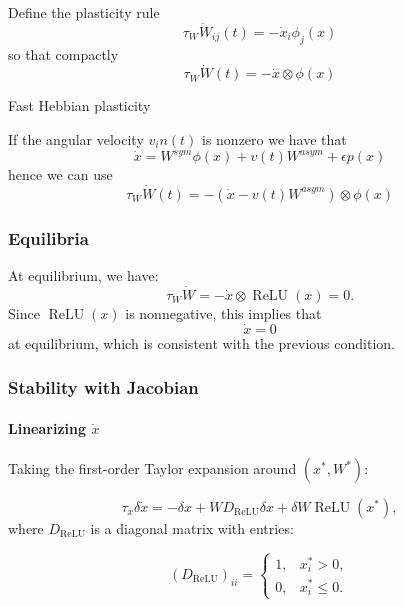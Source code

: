 \documentclass{article}
\theoremstyle{definition} \newtheorem{definition}{Definition}
\theoremstyle{remark} \newtheorem{remark}{Remark}
\newcounter{ct}
\begin{document}
Define the plasticity rule
\begin{equation}\label{eq:plasticity_heur}
\tau_W\dot W_{ij}(t) = - \dot x_i \phi_j(x) 
\end{equation}
so that compactly
\begin{equation}\label{eq:plasticity_heur_comp}
\tau_W\dot W(t) = - \dot x \otimes \phi(x) 
\end{equation}

Fast Hebbian plasticity \citep{lansner2023fast}

If the angular velocity $v_in(t)$ is nonzero we have that 
\begin{equation}
\dot x = W^{sym}\phi(x) + v(t)W^{asym} + \epsilon p(x)
\end{equation}
hence we can use
\begin{equation}\label{eq:plasticity_heur_comp_vin}
\tau_W\dot W(t) = - (\dot x - v(t)W^{asym}) \otimes \phi(x) 
\end{equation}

\subsubsection{Equilibria}
At equilibrium, we have:
\begin{equation}
    \tau_W \dot{W} = - \dot{x} \otimes \operatorname{ReLU}(x) = 0.
\end{equation}
Since \( \operatorname{ReLU}(x) \) is nonnegative, this implies that
\begin{equation}
    \dot{x} = 0
\end{equation}
at equilibrium, which is consistent with the previous condition.


\subsubsection{Stability with Jacobian}
\citep{wersing2001dynamical}
\paragraph{Linearizing $\dot x$}
Taking the first-order Taylor expansion around \( (x^*, W^*) \):

\begin{equation}
    \tau_x \delta \dot{x} = -\delta x + W D_{\operatorname{ReLU}} \delta x + \delta W \operatorname{ReLU}(x^*),
\end{equation}
where \( D_{\operatorname{ReLU}} \) is a diagonal matrix with entries:

\begin{equation}
    (D_{\operatorname{ReLU}})_{ii} =
    \begin{cases}
        1, & x^*_i > 0, \\
        0, & x^*_i \leq 0.
    \end{cases}
\end{equation}
\end{document}
